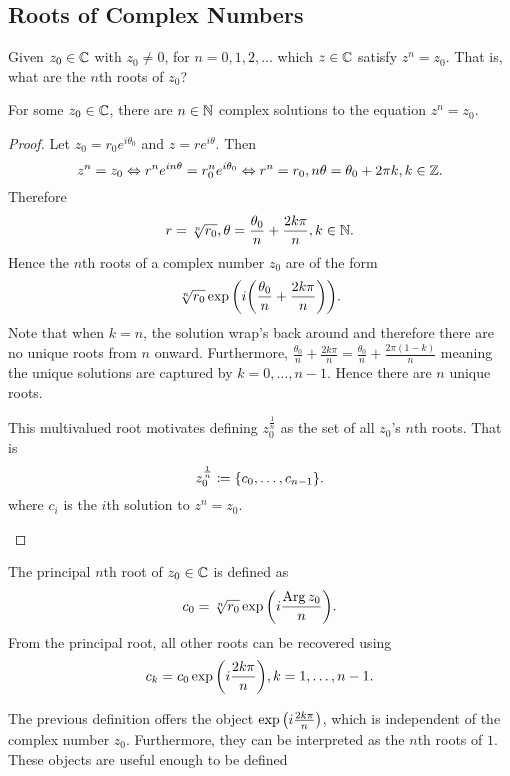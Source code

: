 \documentclass[../notes.tex]{subfiles}
\begin{document}
\subsection{Roots of Complex Numbers}
\begin{center}
    Given $z_0 \in \mathbb{C}$ with $z_0 \neq 0$, for $n = 0,1,2,\ldots$ which $z \in \mathbb{C}$ satisfy $z^n = z_0$. That is, what are the $n$th roots of $z_0$?
\end{center}

\begin{theorem}
    For some $z_0 \in \mathbb{C}$, there are $n \in \mathbb{N}$ complex solutions to the equation $z^n = z_0$.
\end{theorem}

\begin{proof}
    Let $z_0 = r_0 e^{i \theta_0}$ and $z = r e^{i \theta}$. Then
    \[
        z^n = z_0 \Leftrightarrow r^n e^{in \theta} = r_0^n e^{i \theta_0} \Leftrightarrow r^n = r_0, n \theta = \theta_0 + 2 \pi k, k \in \mathbb{Z}
    .\]
    Therefore
    \[
        r = \sqrt[n]{r_0}, \theta = \frac{\theta_0}{n} + \frac{2k \pi}{n}, k \in \mathbb{N}
    .\]
    Hence the $n$th roots of a complex number $z_0$ are of the form
    \[
        \sqrt[n]{r_0} \exp\qty(i\qty(\frac{\theta_0}{n} + \frac{2k \pi}{n}))
    .\]
    Note that when $k = n$, the solution wrap's back around and therefore there are no unique roots from $n$ onward. Furthermore, $\frac{\theta_0}{n} + \frac{2k \pi}{n} = \frac{\theta_0}{n} + \frac{2\pi (1-k)}{n}$ meaning the unique solutions are captured by $k = 0,\ldots, n-1$. Hence there are $n$ unique roots.

    \begin{remark}
        This multivalued root motivates defining $z_0^{\frac{1}{n}}$ as the set of all $z_0$'s $n$th roots. That is
        \[
            z_0^{\frac{1}{n}} \coloneq \qty{c_0, \ldots, c_{n-1}}
        .\]
        where $c_i$ is the $i$th solution to $z^n = z_0$.
    \end{remark}
\end{proof}

\begin{definition}
    The principal $n$th root of $z_0 \in \mathbb{C}$ is defined as
    \[
        c_0 = \sqrt[n]{r_0} \exp\qty(i \frac{\operatorname{Arg} z_0}{n})
    .\]
    From the principal root, all other roots can be recovered using
    \[
        c_k = c_0 \exp\qty(i \frac{2k \pi}{n}), k = 1,\ldots, n-1
    .\]
\end{definition}

The previous definition offers the object $\exp\qty(i \frac{2k \pi}{n})$, which is independent of the complex number $z_0$. Furthermore, they can be interpreted as the $n$th roots of $1$. These objects are useful enough to be defined
\end{document}
